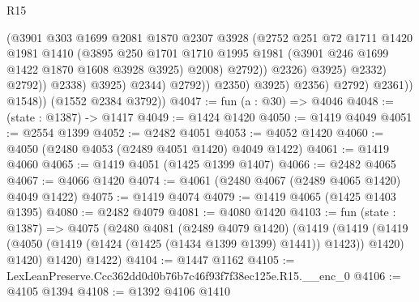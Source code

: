 \begin{lexlean}{R15}
\begin{coremodule}
                                          (@3901
                                            @303
                                            @1699
                                            @2081
                                            @1870
                                            @2307
                                            @3928
                                            (@2752
                                              @251
                                              @72
                                              @1711
                                              @1420
                                              @1981
                                              @1410
                                              (@3895
                                                @250
                                                @1701
                                                @1710
                                                @1995
                                                @1981
                                                (@3901 @246 @1699 @1422 @1870 @1608 @3928 @3925)
                                                @2008)
                                              @2792))
                                          @2326)
                                        @3925)
                                      @2332)
                                    @2792))
                                @2338)
                              @3925)
                            @2344)
                          @2792))
                      @2350)
                    @3925)
                  @2356)
                @2792)
              @2361))
          @1548))
      (@1552 @2384 @3792))
@4047 := fun (a : @30) => @4046
@4048 := (state : @1387) -> @1417
@4049 := @1424 @1420
@4050 := @1419 @4049
@4051 := @2554 @1399
@4052 := @2482 @4051
@4053 := @4052 @1420
@4060 := @4050 (@2480 @4053 (@2489 @4051 @1420) @4049 @1422)
@4061 := @1419 @4060
@4065 := @1419 @4051 (@1425 @1399 @1407)
@4066 := @2482 @4065
@4067 := @4066 @1420
@4074 := @4061 (@2480 @4067 (@2489 @4065 @1420) @4049 @1422)
@4075 := @1419 @4074
@4079 := @1419 @4065 (@1425 @1403 @1395)
@4080 := @2482 @4079
@4081 := @4080 @1420
@4103 := fun (state : @1387) =>
  @4075
    (@2480
      @4081
      (@2489 @4079 @1420)
      (@1419
        (@1419 (@1419 (@4050 (@1419 (@1424 (@1425 (@1434 @1399 @1399) @1441)) @1423)) @1420) @1420)
        @1420)
      @1422)
@4104 := @1447 @1162
@4105 := LexLeanPreserve.Ccc362dd0d0b76b7c46f93f7f38ec125e.R15.__enc_0
@4106 := @4105 @1394
@4108 := @1392 @4106 @1410

\end{coremodule}
\end{lexlean}
